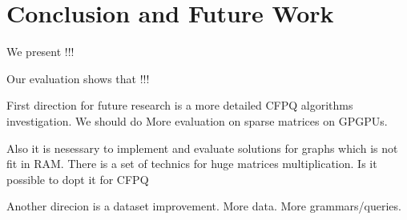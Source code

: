\section{Conclusion and Future Work}

We present !!!

Our evaluation shows that !!!

First direction for future research is a more detailed CFPQ algorithms investigation.
We should do More evaluation on sparse matrices on GPGPUs.

Also it is nesessary to implement and evaluate solutions for graphs which is not fit in RAM.
There is a set of technics for huge matrices multiplication.
Is it possible to dopt it for CFPQ

Another direcion is a dataset improvement.
More data.
More grammars/queries.
